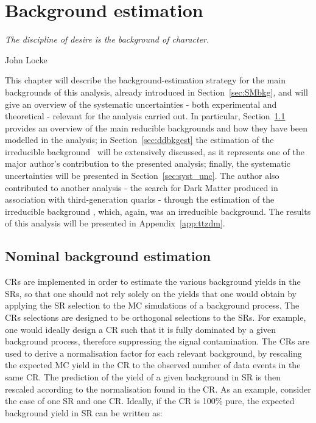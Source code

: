 \chapter{Background estimation}
\label{ch:bkgest}
\epigraph{\emph{The discipline of desire is the background of character.}}{John Locke}

	This chapter will describe the background-estimation strategy for the main backgrounds of this analysis, already introduced in Section~\ref{sec:SMbkg}, and will give an overview of the systematic uncertainties - both experimental and theoretical - relevant for the analysis carried out. In particular, Section~\ref{sec:bkgest} provides an overview of the main reducible backgrounds and how they have been modelled in the analysis; in Section~\ref{sec:ddbkgest} the estimation of the irreducible background \ttZ\ will be extensively discussed, as it represents one of the major author's contribution to the presented analysis; finally, the systematic uncertainties will be presented in Section~\ref{sec:syst_unc}. The author also contributed to another analysis - the search for Dark Matter produced in association with third-generation quarks - through the estimation of the irreducible background \ttZ, which, again, was an irreducible background. The results of this analysis will be presented in Appendix~\ref{app:ttzdm}. 

	\section{Nominal background estimation}
	\label{sec:bkgest}

		\acp{CR} are implemented in order to estimate the various background yields in the \acp{SR}, so that one should not rely solely on the yields that one would obtain by applying the \ac{SR} selection to the \ac{MC} simulations of a background process. The \acp{CR} selections are designed to be orthogonal selections to the \acp{SR}. For example, one would ideally design a \ac{CR} such that it is fully dominated by a given background process, therefore suppressing the signal contamination. The \acp{CR} are used to derive a normalisation factor for each relevant background, by rescaling the expected \ac{MC} yield in the \ac{CR} to the observed number of data events in the same \ac{CR}. The prediction of the yield of a given background in \ac{SR} is then rescaled according to the normalisation found in the \ac{CR}. As an example, consider the case of one \ac{SR} and one \ac{CR}. Ideally, if the \ac{CR} is 100\% pure, the expected background yield in \ac{SR} can be written as:

